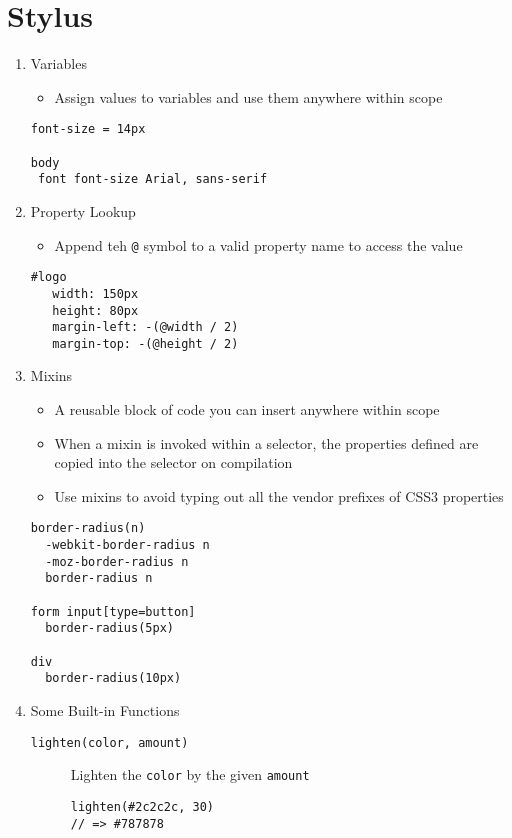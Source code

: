 \documentclass[10pt, twocolumn]{article}
\begin{document}
\section{Stylus}
\begin{enumerate}

\item Variables
\begin{itemize}
\item Assign values to variables and use them anywhere within scope
\end{itemize}
\begin{lstlisting}[frame=single]
font-size = 14px

body
 font font-size Arial, sans-serif
\end{lstlisting}

\item Property Lookup
\begin{itemize}
\item Append teh \texttt{@} symbol to a valid property name to access the value
\end{itemize}
\begin{lstlisting}[frame=single]
#logo
   width: 150px
   height: 80px
   margin-left: -(@width / 2)
   margin-top: -(@height / 2)
\end{lstlisting}

\item Mixins
\begin{itemize}
\item A reusable block of code you can insert anywhere within scope
\item When a mixin is invoked within a selector, the properties defined are copied into the selector on compilation
\item Use mixins to avoid typing out all the vendor prefixes of CSS3 properties
\end{itemize}
\begin{lstlisting}[frame=single]
border-radius(n)
  -webkit-border-radius n
  -moz-border-radius n
  border-radius n

form input[type=button]
  border-radius(5px)

div
  border-radius(10px)    
\end{lstlisting}

\item Some Built-in Functions
\begin{description}
\item[\texttt{lighten(color, amount)}] Lighten the \texttt{color} by the given \texttt{amount}
\begin{lstlisting}[frame=single]
lighten(#2c2c2c, 30)
// => #787878


\end{lstlisting}
\end{description}
\end{enumerate}
\end{document}

